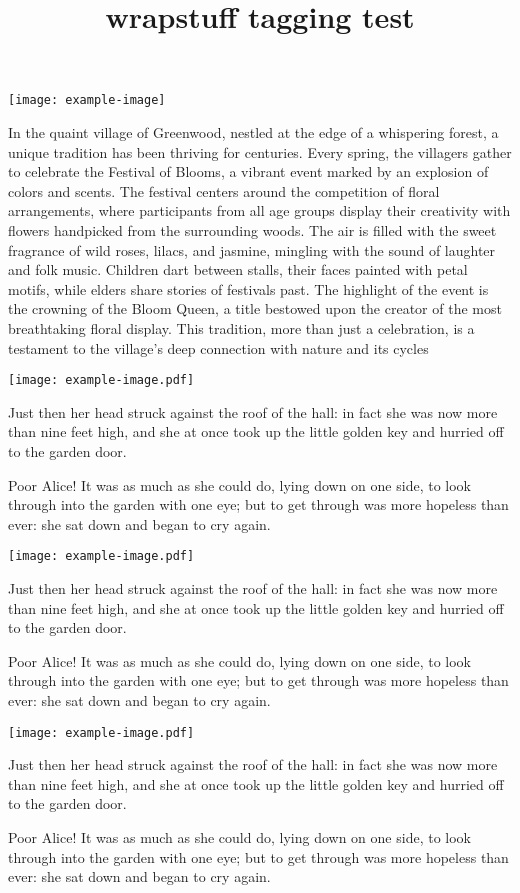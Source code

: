 \documentclass{article}
\title{wrapstuff tagging test}
\begin{document}
\begin{wrapstuff}[c,top=1]
\texttt{[image: example-image]}
\end{wrapstuff}

In the quaint village of Greenwood, nestled at the edge of a whispering forest,
a unique tradition has been thriving for centuries. Every spring, the villagers
gather to celebrate the Festival of Blooms, a vibrant event marked by an
explosion of colors and scents. The festival centers around the competition of
floral arrangements, where participants from all age groups display their
creativity with flowers handpicked from the surrounding woods. The air is filled
with the sweet fragrance of wild roses, lilacs, and jasmine, mingling with the
sound of laughter and folk music. Children dart between stalls, their faces
painted with petal motifs, while elders share stories of festivals past. The
highlight of the event is the crowning of the Bloom Queen, a title bestowed upon
the creator of the most breathtaking floral display. This tradition, more than
just a celebration, is a testament to the village's deep connection with nature
and its cycles

\def\lorem{%
Just then her head struck against the roof of the hall:
in fact she was now more than nine feet high, and she
at once took up the little golden key and hurried off
to the garden door.\par
Poor Alice! It was as much as she could do, lying down
on one side, to look through into the garden with one eye;
but to get through was more hopeless than ever:
she sat down and began to cry again.}
\begin{wrapstuff}[c,column=par]
\texttt{[image: example-image.pdf]}
\end{wrapstuff}
\lorem
\begin{wrapstuff}[c]
\texttt{[image: example-image.pdf]}
\end{wrapstuff}
\lorem
\begin{wrapstuff}[c,column=false]
\texttt{[image: example-image.pdf]}
\end{wrapstuff}
\lorem
\end{document}
